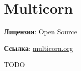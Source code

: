 \section{Multicorn}
\textbf{Лицензия}: Open Source

\textbf{Ссылка}: \href{http://multicorn.org/}{multicorn.org}

TODO